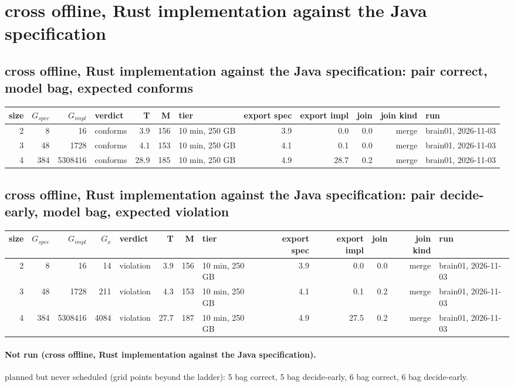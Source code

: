 \documentclass[10pt]{article}
\begin{document}
\section*{cross offline, Rust implementation against the Java specification}
\subsection*{cross offline, Rust implementation against the Java specification: pair \textsf{correct}, model bag, expected conforms}
\begin{longtable}{@{}rrrlrrlrrrrl@{}}
\toprule
size & $G_{\mathit{spec}}$ & $G_{\mathit{impl}}$ & verdict & T & M & tier & export spec & export impl & join & join kind & run \\
\midrule
\endhead
\color{blue} 2 & 8 & 16 & conforms & 3.9 & 156 & 10 min, 250 GB & 3.9 & 0.0 & 0.0 & merge & brain01, 2026-11-03 \\
\color{blue} 3 & 48 & 1728 & conforms & 4.1 & 153 & 10 min, 250 GB & 4.1 & 0.1 & 0.0 & merge & brain01, 2026-11-03 \\
\color{blue} 4 & 384 & 5308416 & conforms & 28.9 & 185 & 10 min, 250 GB & 4.9 & 28.7 & 0.2 & merge & brain01, 2026-11-03 \\
\bottomrule
\end{longtable}
\subsection*{cross offline, Rust implementation against the Java specification: pair \textsf{decide-early}, model bag, expected violation}
\begin{longtable}{@{}rrrrlrrlrrrrl@{}}
\toprule
size & $G_{\mathit{spec}}$ & $G_{\mathit{impl}}$ & $G_x$ & verdict & T & M & tier & export spec & export impl & join & join kind & run \\
\midrule
\endhead
\color{blue} 2 & 8 & 16 & 14 & violation & 3.9 & 156 & 10 min, 250 GB & 3.9 & 0.0 & 0.0 & merge & brain01, 2026-11-03 \\
\color{blue} 3 & 48 & 1728 & 211 & violation & 4.3 & 153 & 10 min, 250 GB & 4.1 & 0.1 & 0.2 & merge & brain01, 2026-11-03 \\
\color{blue} 4 & 384 & 5308416 & 4084 & violation & 27.7 & 187 & 10 min, 250 GB & 4.9 & 27.5 & 0.2 & merge & brain01, 2026-11-03 \\
\bottomrule
\end{longtable}
\paragraph{Not run (cross offline, Rust implementation against the Java specification).}
planned but never scheduled (grid points beyond the ladder): 5 bag correct, 5 bag decide-early, 6 bag correct, 6 bag decide-early.\par
\end{document}
